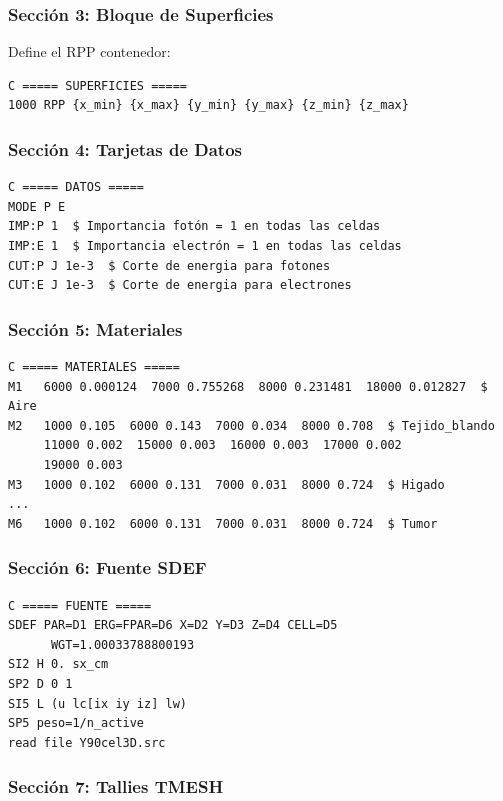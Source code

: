 \documentclass[12pt,a4paper]{article}
\begin{document}
\subsubsection{Sección 3: Bloque de Superficies}

Define el RPP contenedor:

\begin{lstlisting}
C ===== SUPERFICIES =====
1000 RPP {x_min} {x_max} {y_min} {y_max} {z_min} {z_max}
\end{lstlisting}

\subsubsection{Sección 4: Tarjetas de Datos}

\begin{lstlisting}
C ===== DATOS =====
MODE P E
IMP:P 1  $ Importancia fotón = 1 en todas las celdas
IMP:E 1  $ Importancia electrón = 1 en todas las celdas
CUT:P J 1e-3  $ Corte de energia para fotones
CUT:E J 1e-3  $ Corte de energia para electrones
\end{lstlisting}

\subsubsection{Sección 5: Materiales}

\begin{lstlisting}
C ===== MATERIALES =====
M1   6000 0.000124  7000 0.755268  8000 0.231481  18000 0.012827  $ Aire
M2   1000 0.105  6000 0.143  7000 0.034  8000 0.708  $ Tejido_blando
     11000 0.002  15000 0.003  16000 0.003  17000 0.002
     19000 0.003
M3   1000 0.102  6000 0.131  7000 0.031  8000 0.724  $ Higado
...
M6   1000 0.102  6000 0.131  7000 0.031  8000 0.724  $ Tumor
\end{lstlisting}

\subsubsection{Sección 6: Fuente SDEF}

\begin{lstlisting}
C ===== FUENTE =====
SDEF PAR=D1 ERG=FPAR=D6 X=D2 Y=D3 Z=D4 CELL=D5
      WGT=1.00033788800193
SI2 H 0. sx_cm
SP2 D 0 1
SI5 L (u lc[ix iy iz] lw)
SP5 peso=1/n_active
read file Y90cel3D.src
\end{lstlisting}

\subsubsection{Sección 7: Tallies TMESH}
\end{document}
